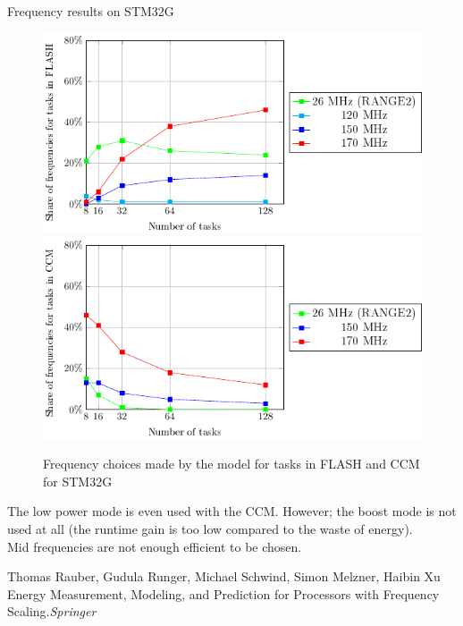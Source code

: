 \documentclass[
	11pt, %
]{beamer}
\begin{document}
\begin{frame}{Frequency results on STM32G}
	\begin{figure}
        \includegraphics[scale = 0.6]{data/model/f_choose_32g_flash.pdf}
		\includegraphics[scale = 0.6]{data/model/f_choose_32g_ccm.pdf}
		\caption{Frequency choices made by the model for tasks in FLASH and CCM for STM32G}
	\end{figure}
The low power mode is even used with the CCM. 
However; the boost mode is not used at all (the runtime gain is too low compared to the waste of energy).\\
Mid frequencies are not enough efficient to be chosen. \\
\begin{thebibliography}{10}
	{\tiny
	\bibitem{}Thomas Rauber, Gudula Runger, Michael Schwind, Simon Melzner, Haibin Xu
	\newblock Energy Measurement, Modeling, and Prediction for Processors with Frequency Scaling.{\em{Springer}}
	}
\end{thebibliography}

\end{frame}
\end{document}
